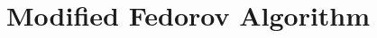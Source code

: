 \documentclass[11pt,t]{beamer}
\begin{document}


\section{Modified Fedorov Algorithm}
\end{document}
